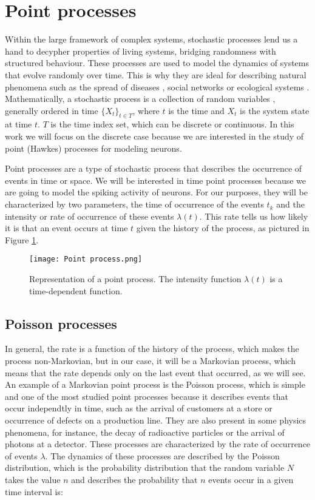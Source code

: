 \section{Point processes} \label{sec:point_processes}
Within the large framework of complex systems, stochastic processes lend us a hand to decypher properties of living systems, bridging randomness with structured behaviour.
These processes are used to model the dynamics of systems that evolve randomly over time. This is why they are ideal for describing natural phenomena such as 
the spread of diseases \cite{Chowell}, social networks \cite{castellano2009statistical} or ecological systems \cite{azaele2016statistical}. Mathematically, a stochastic process
is a collection of random variables \cite{McKane}, generally ordered in time $ \{X_t\}_{t \in T} $, where $t$ is the time and $X_t$ is the system state at time $t$. $T$ is the time index set, 
which can be discrete or continuous. In this work we will focus on the discrete case because we are interested in the study of point (Hawkes) processes for modeling neurons. 

Point processes are a type of stochastic process that describes the occurrence of events in time or space. We will be interested in time point processes because 
we are going to model the spiking activity of neurons. For our purposes, they will be characterized by two parameters, the time of occurrence
of the events $t_k$ and the intensity or rate of occurrence of these events $\lambda(t)$. This rate tells us how likely it is that an event occurs at time $t$ given the history of the process, 
as pictured in Figure \ref{f:point_process}.

\begin{figure}[H]
    \centering
    \texttt{[image: Point process.png]}
    \caption{Representation of a point process. The intensity function $\lambda(t)$ is a time-dependent function.}
    \label{f:point_process}
\end{figure}

\subsection{Poisson processes} \label{subsec:Poisson_processes}

In general, the rate is a function of the history of the process, which makes the process non-Markovian, but in our case, it will be a Markovian process, which means that the rate depends 
only on the last event that occurred, as we will see. An example of a Markovian point process is the Poisson process, which is simple and one of the most studied point processes because 
it describes events that occur independtly in time, such as the arrival of customers at a store or occurrence of defects on a production line. They are also present in some physics phenomena,
for instance, the decay of radioactive particles or the arrival of photons at a detector. These processes are characterized by the rate of occurrence of events $\lambda$.
The dynamics of these processes are described by the Poisson distribution, which is the probability distribution that the random variable $N$ takes the value $n$ and describes the 
probability that $n$ events occur in a given time interval is:

